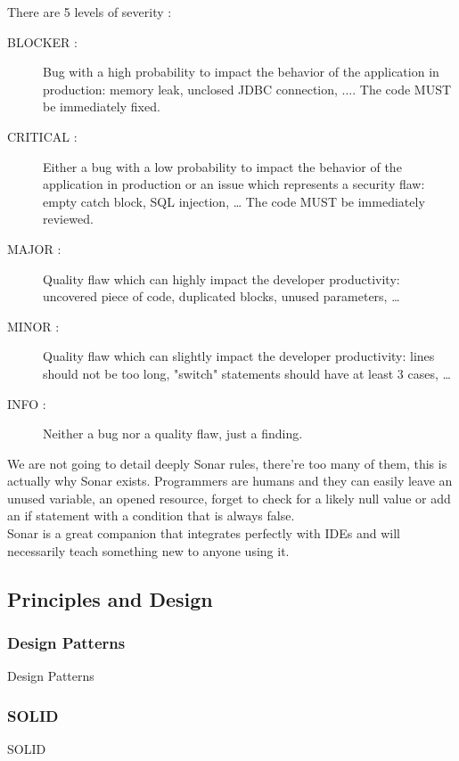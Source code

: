 There are 5 levels of severity :

\begin{description}
    \item[BLOCKER :]
Bug with a high probability to impact the behavior of the application
in production: memory leak, unclosed JDBC connection, ....
The code MUST be immediately fixed.
    \item[CRITICAL :]
Either a bug with a low probability to impact the behavior of the
application in production or an issue which represents a
security flaw: empty catch block, SQL injection, \ldots
The code MUST be immediately reviewed.
    \item[MAJOR :]
Quality flaw which can highly impact the developer productivity:
uncovered piece of code, duplicated blocks, unused parameters,
    \ldots
    \item[MINOR :]
Quality flaw which can slightly impact the developer productivity:
lines should not be too long, "switch" statements should have at
least 3 cases, \ldots
    \item[INFO :]
Neither a bug nor a quality flaw, just a finding.
\end{description}

We are not going to detail deeply Sonar rules, there're too many of them,
this is actually why Sonar exists.
Programmers are humans and they can easily leave an unused variable, an
opened resource, forget to check for a likely null value or add an if
statement with a condition that is always false. \\
Sonar is a great companion that integrates perfectly with IDEs and will
necessarily teach something new to anyone using it.

\subsection{Principles and Design}\label{subsec:principles}

\subsubsection{Design Patterns}
Design Patterns

\subsubsection{SOLID}
SOLID

